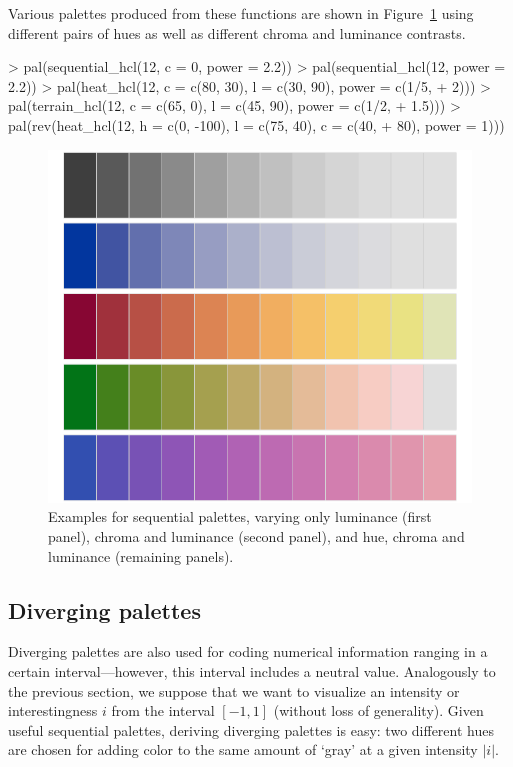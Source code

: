 \documentclass{Z}
\begin{document}
Various palettes produced from these functions are shown in
Figure~\ref{fig:pal-s-examples} using different pairs of hues as well as different
chroma and luminance contrasts.
\begin{Schunk}
\begin{Sinput}
> pal(sequential_hcl(12, c = 0, power = 2.2))
> pal(sequential_hcl(12, power = 2.2))
> pal(heat_hcl(12, c = c(80, 30), l = c(30, 90), power = c(1/5, 
+     2)))
> pal(terrain_hcl(12, c = c(65, 0), l = c(45, 90), power = c(1/2, 
+     1.5)))
> pal(rev(heat_hcl(12, h = c(0, -100), l = c(75, 40), c = c(40, 
+     80), power = 1)))
\end{Sinput}
\end{Schunk}

\begin{figure}[p]
\begin{center}
\includegraphics{hcl-colors-pal-s1}
\caption{\label{fig:pal-s-examples} Examples for sequential palettes, varying
only luminance (first panel), chroma and luminance (second panel), and hue,
chroma and luminance (remaining panels).}
\end{center}
\end{figure}


\subsection{Diverging palettes} \label{sec:diverging}

Diverging palettes are also used for coding numerical information ranging in a certain
interval---however, this interval includes a neutral value. Analogously to the previous
section, we suppose that we want to visualize an intensity or interestingness $i$
from the interval $[-1, 1]$ (without loss of generality).
Given useful sequential palettes, deriving diverging palettes is easy: two different hues are
chosen for adding color to the same amount of `gray' at a given intensity $|i|$.
\end{document}

